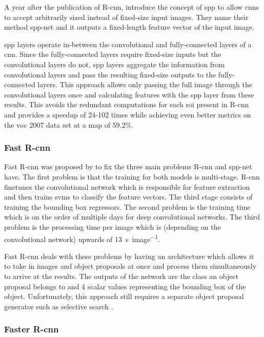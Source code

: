 \documentclass[draft,final]{vutinfth} %
\begin{document}
A year after the publication of R-\gls{cnn}, \textcite{he2015}
introduce the concept of \gls{spp} to allow \glspl{cnn} to accept
arbitrarily sized instead of fixed-size input images. They name their
method \gls{spp}-net and it outputs a fixed-length feature vector of
the input image.

\gls{spp} layers operate in-between the convolutional and
fully-connected layers of a \gls{cnn}. Since the fully-connected
layers require fixed-size inputs but the convolutional layers do not,
\gls{spp} layers aggregate the information from convolutional layers
and pass the resulting fixed-size outputs to the fully-connected
layers. This approach allows only passing the full image through the
convolutional layers once and calculating features with the \gls{spp}
layer from these results. This avoids the redundant computations for
each \gls{roi} present in R-\gls{cnn} and provides a speedup of 24-102
times while achieving even better metrics on the \gls{voc} 2007 data
set at a \gls{map} of 59.2\%.

\subsubsection{Fast R-\gls{cnn}}
\label{sssec:theory-fast-rcnn}

Fast R-\gls{cnn} was proposed by \textcite{girshick2015a} to fix the
three main problems R-\gls{cnn} and \gls{spp}-net have. The first
problem is that the training for both models is
multi-stage. R-\gls{cnn} finetunes the convolutional network which is
responsible for feature extraction and then trains \glspl{svm} to
classify the feature vectors. The third stage consists of training the
bounding box regressors. The second problem is the training time which
is on the order of multiple days for deep convolutional networks. The
third problem is the processing time per image which is (depending on
the convolutional network) upwards of \qty{13}{\s\per image}.

Fast R-\gls{cnn} deals with these problems by having an architecture
which allows it to take in images and object proposals at once and
process them simultaneously to arrive at the results. The outputs of
the network are the class an object proposal belongs to and 4 scalar
values representing the bounding box of the object. Unfortunately,
this approach still requires a separate object proposal generator such
as selective search \cite{uijlings2013}.

\subsubsection{Faster R-\gls{cnn}}
\label{sssec:theory-faster-rcnn}
\end{document}
